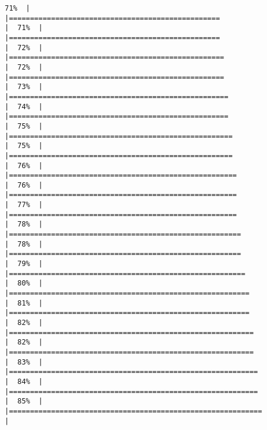 \documentclass[
]{book}
\begin{document}
\begin{verbatim}
71%  |                                                                              |==================================================                    |  71%  |                                                                              |==================================================                    |  72%  |                                                                              |===================================================                   |  72%  |                                                                              |===================================================                   |  73%  |                                                                              |====================================================                  |  74%  |                                                                              |====================================================                  |  75%  |                                                                              |=====================================================                 |  75%  |                                                                              |=====================================================                 |  76%  |                                                                              |======================================================                |  76%  |                                                                              |======================================================                |  77%  |                                                                              |======================================================                |  78%  |                                                                              |=======================================================               |  78%  |                                                                              |=======================================================               |  79%  |                                                                              |========================================================              |  80%  |                                                                              |=========================================================             |  81%  |                                                                              |=========================================================             |  82%  |                                                                              |==========================================================            |  82%  |                                                                              |==========================================================            |  83%  |                                                                              |===========================================================           |  84%  |                                                                              |===========================================================           |  85%  |                                                                              |============================================================          |  
\end{verbatim}
\end{document}
